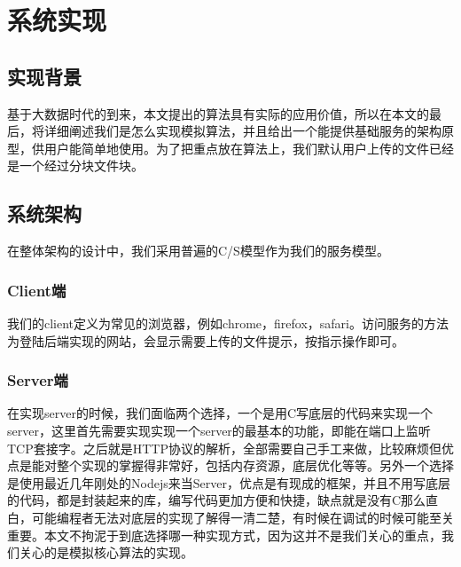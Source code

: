 
\chapter{系统实现}
\label{chap:impl}

\section{实现背景}
\label{sec:backgroud}

基于大数据时代的到来，本文提出的算法具有实际的应用价值，所以在本文的最后，将详细阐述我们是怎么实现模拟算法，并且给出一个能提供基础服务的架构原型，供用户能简单地使用。为了把重点放在算法上，我们默认用户上传的文件已经是一个经过分块文件块。

\section{系统架构}
\label{sec:arch}

在整体架构的设计中，我们采用普遍的C/S模型作为我们的服务模型。

\subsection{Client端}

我们的client定义为常见的浏览器，例如chrome，firefox，safari。访问服务的方法为登陆后端实现的网站，会显示需要上传的文件提示，按指示操作即可。

\subsection{Server端}

在实现server的时候，我们面临两个选择，一个是用C写底层的代码来实现一个server，这里首先需要实现实现一个server的最基本的功能，即能在端口上监听TCP套接字。之后就是HTTP协议的解析，全部需要自己手工来做，比较麻烦但优点是能对整个实现的掌握得非常好，包括内存资源，底层优化等等。另外一个选择是使用最近几年刚处的Nodejs来当Server，优点是有现成的框架，并且不用写底层的代码，都是封装起来的库，编写代码更加方便和快捷，缺点就是没有C那么直白，可能编程者无法对底层的实现了解得一清二楚，有时候在调试的时候可能至关重要。本文不拘泥于到底选择哪一种实现方式，因为这并不是我们关心的重点，我们关心的是模拟核心算法的实现。

